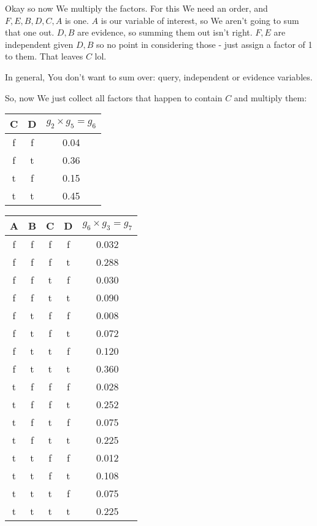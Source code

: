 \documentclass{article}
\begin{document}
			Okay so now We multiply the factors. For this We need an order, and $F, E, B, D, C, A$ is one. $A$ is our variable of interest, so We aren't going to sum that one out. $D, B$ are evidence, so summing them out isn't right. $F, E$ are independent given $D, B$ so no point in considering those - just assign a factor of 1 to them. That leaves $C$ lol.
			
			In general, You don't want to sum over: query, independent or evidence variables.
			
			So, now We just collect all factors that happen to contain $C$ and multiply them:
			
			\begin{center}
				\begin{tabular}{ |c|c|c|  } 
					\hline
					C & D & $g_2\times g_5 = g_6$\\
					\hline 
					f & f & 0.04 \\
					f & t & 0.36 \\
					t & f & 0.15\\
					t & t & 0.45 \\ 
					\hline
				\end{tabular}
			\end{center}			
			
			\begin{center}
				\begin{tabular}{ |c|c|c|c|c|  } 
					\hline
					A& B& C & D & $g_6\times g_3 = g_7$\\
					\hline 
					f & f & f & f & 0.032 \\
					f & f & f & t & 0.288 \\
					f & f & t & f & 0.030 \\
					f & f & t & t & 0.090 \\
					f & t & f & f & 0.008 \\
					f & t & f & t & 0.072 \\
					f & t & t & f & 0.120 \\
					f & t & t & t & 0.360 \\
					t & f & f & f & 0.028 \\
					t & f & f & t & 0.252 \\
					t & f & t & f & 0.075 \\
					t & f & t & t & 0.225 \\
					t & t & f & f & 0.012 \\
					t & t & f & t & 0.108 \\
					t & t & t & f & 0.075 \\
					t & t & t & t & 0.225 \\
					\hline
				\end{tabular}
			\end{center} 
			
\end{document}
